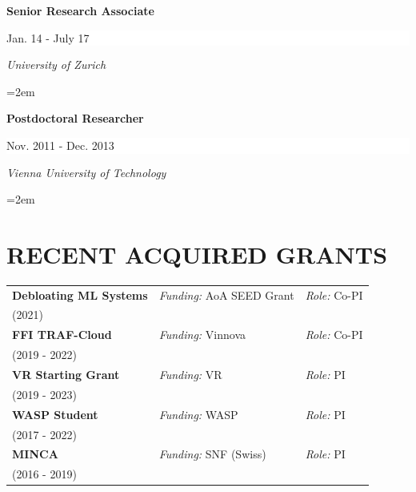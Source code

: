 \documentclass[paper=letter,fontsize=11pt]{scrartcl} %
\newcommand{\NewPart}[2]{\section*{\uppercase{#1} #2}}
\newcommand{\EducationEntry}[4]{
		\noindent \textbf{#1} \hfill      %
		\colorbox{White}{%
			\parbox{10em}{%
			\hfill\color{Black}#2}} \par  %
		\noindent \textit{#3} \par        %
		\noindent\hangindent=2em\hangafter=0 \small #4 %
		\normalsize \par}
\begin{document}
\EducationEntry{Senior Research Associate}{Jan. 14 - July 17}{University of
Zurich}{
}
\EducationEntry{Postdoctoral Researcher}{Nov. 2011 - Dec. 2013}{Vienna
University of Technology}{}

\NewPart{Recent Acquired Grants}{}

\renewcommand{\arraystretch}{0.75}
  \begin{tabular}{p{4.8cm}ll}
          \textbf{Debloating ML Systems} & \emph{Funding:} AoA SEED Grant & \emph{Role:} Co-PI \\
    (2021) & & \\
        \textbf{FFI TRAF-Cloud} & \emph{Funding:} Vinnova & \emph{Role:} Co-PI \\
    (2019 - 2022) & & \\
      \textbf{VR Starting Grant} & \emph{Funding:} VR & \emph{Role:} PI \\
    (2019 - 2023) & & \\
      \textbf{WASP Student} & \emph{Funding:} WASP & \emph{Role:} PI \\
    (2017 - 2022) & & \\
      \textbf{MINCA} & \emph{Funding:} SNF (Swiss) & \emph{Role:} PI \\
    (2016 - 2019) & & \\
  \end{tabular}

%
%
\end{document}
